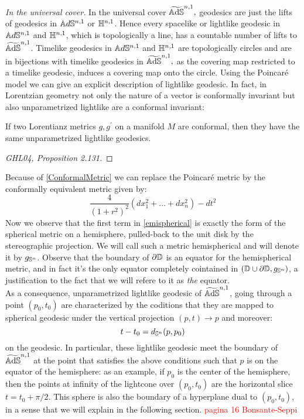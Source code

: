 \textit{In the universal cover.} In the universal cover $\AS^{n,1},$ geodesics are just the lifts of geodesics in $\A^{n,1}$ or $\H^{n,1}$. Hence every spacelike or lightlike geodesic in $\A^{n,1}$ and $\H^{n,1}$, which is topologically a line, has a countable number of lifts to $\AS^{n,1}$. Timelike geodesics in $\A^{n,1}$ and $\H^{n,1}$ are topologically circles and are in bijections with timelike geodesics in $\AS^{n,1},$ as the covering map restricted to a timelike geodesic, induces a covering map onto the circle. Using the Poincaré model we can give an explicit description of lightlike geodesic. In fact, in Lorentzian geometry not only the nature of a vector is conformally invariant but also unparametrized lightlike are a conformal invariant: 
\begin{theorem}\label{ConformalMetric} If two Lorentianz metrics $g,g^{\prime} $ on a manifold $M$ are conformal, then they have the same unparametrized lightlike geodesics.
\end{theorem}
\begin{proof}
    [GHL04, Proposition 2.131]
\end{proof}
Because of \ref{ConformalMetric} we can replace the Poincaré metric by the conformally equivalent metric given by:
\begin{equation}\label{emispherical}
    \frac{4}{(1+r^2)^2}(dx_1^2+\dots+dx_n^2)-dt^2
\end{equation} 
Now we observe that the first term in \ref{emispherical} is exactly the form of the spherical metric on a hemisphere, pulled-back to the unit disk by the stereographic projection. We will call such a metric hemispherical and will denote it by $g_{\S^n}$. Observe that the boundary of $\partial\D$ is an equator for the hemispherical metric, and in fact it's the only equator completely cointained in $(\D\cup\partial\D,g_{\S^n})$, a justification to the fact that we will refere to it as \textit{the} equator.\\
As a consequence, unparametrized lightlike geodesic of $\AS^{n,1}$, going through a point $(p_0,t_0)$ are characterized by the coditions that they are mapped to spherical geodesic under the vertical projection $(p,t)\to p$ and moreover: 
\[
    t-t_0=d_{\S^n}(p,p_0)
\] on the geodesic.  In particular, these lightlike geodesic meet the boundary of $\AS^{n,1}$ at the point that satisfies the above conditions such that $p$ is on the equator of the hemisphere: as an example, if $p_0$ is the center of the hemisphere, then the points at infinity of the lightcone over $(p_0,t_0)$ are the horizontal slice $t=t_{0}+\pi/2.$ This sphere is also the boundary of a hyperplane dual to $(p_0,t_0)$, in a sense that we will explain in the following section. 
\textcolor{red}{pagina 16 Bonsante-Seppi}   
